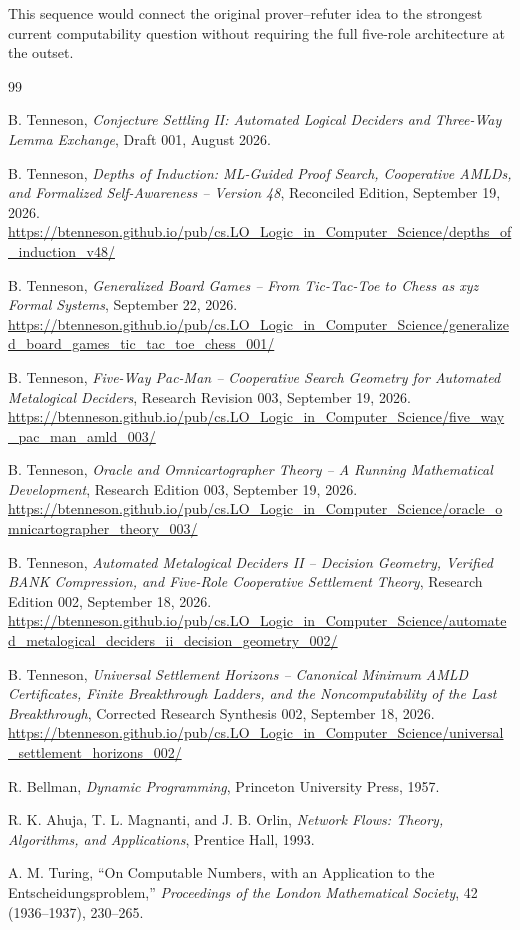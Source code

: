 \documentclass[11pt]{article}
\theoremstyle{remark}
\begin{document}
This sequence would connect the original prover--refuter idea to the strongest current computability question without requiring the full five-role architecture at the outset.

\begin{thebibliography}{99}

B. Tenneson,
\emph{Conjecture Settling II: Automated Logical Deciders and Three-Way Lemma Exchange},
Draft 001, August 2026.

B. Tenneson,
\emph{Depths of Induction: ML-Guided Proof Search, Cooperative AMLDs, and Formalized Self-Awareness -- Version 48},
Reconciled Edition, September 19, 2026.
\newblock \url{https://btenneson.github.io/pub/cs.LO_Logic_in_Computer_Science/depths_of_induction_v48/}

B. Tenneson,
\emph{Generalized Board Games -- From Tic-Tac-Toe to Chess as xyz Formal Systems},
September 22, 2026.
\newblock \url{https://btenneson.github.io/pub/cs.LO_Logic_in_Computer_Science/generalized_board_games_tic_tac_toe_chess_001/}

B. Tenneson,
\emph{Five-Way Pac-Man -- Cooperative Search Geometry for Automated Metalogical Deciders},
Research Revision 003, September 19, 2026.
\newblock \url{https://btenneson.github.io/pub/cs.LO_Logic_in_Computer_Science/five_way_pac_man_amld_003/}

B. Tenneson,
\emph{Oracle and Omnicartographer Theory -- A Running Mathematical Development},
Research Edition 003, September 19, 2026.
\newblock \url{https://btenneson.github.io/pub/cs.LO_Logic_in_Computer_Science/oracle_omnicartographer_theory_003/}

B. Tenneson,
\emph{Automated Metalogical Deciders II -- Decision Geometry, Verified BANK Compression, and Five-Role Cooperative Settlement Theory},
Research Edition 002, September 18, 2026.
\newblock \url{https://btenneson.github.io/pub/cs.LO_Logic_in_Computer_Science/automated_metalogical_deciders_ii_decision_geometry_002/}

B. Tenneson,
\emph{Universal Settlement Horizons -- Canonical Minimum AMLD Certificates, Finite Breakthrough Ladders, and the Noncomputability of the Last Breakthrough},
Corrected Research Synthesis 002, September 18, 2026.
\newblock \url{https://btenneson.github.io/pub/cs.LO_Logic_in_Computer_Science/universal_settlement_horizons_002/}

R. Bellman,
\emph{Dynamic Programming},
Princeton University Press, 1957.

R. K. Ahuja, T. L. Magnanti, and J. B. Orlin,
\emph{Network Flows: Theory, Algorithms, and Applications},
Prentice Hall, 1993.

A. M. Turing,
``On Computable Numbers, with an Application to the Entscheidungsproblem,''
\emph{Proceedings of the London Mathematical Society}, 42 (1936--1937), 230--265.

\end{thebibliography}
\end{document}
